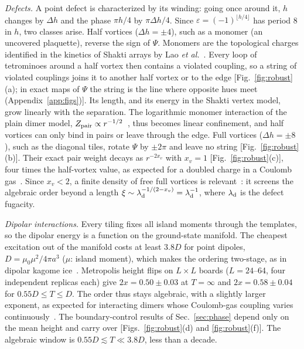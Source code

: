\documentclass[aps,prb,twocolumn,floatfix,longbibliography]{revtex4-2}
\newcommand{\eps}{\varepsilon}
\newcommand{\floor}[1]{\lfloor #1\rfloor}
\begin{document}
\emph{Defects.} A point defect is characterized by its winding: going once around it, $h$ changes by $\Delta h$ and the phase $\pi h/4$ by $\pi\Delta h/4$. Since $\eps=(-1)^{\floor{h/4}}$ has period 8 in $h$, two classes arise. Half vortices ($\Delta h=\pm4$), such as a monomer (an uncovered plaquette), reverse the sign of $\Psi$. Monomers are the topological charges identified in the kinetics of Shakti arrays by Lao \emph{et al.}~\cite{Lao2018}. Every loop of tetrominoes around a half vortex then contains a violated coupling, so a string of violated couplings joins it to another half vortex or to the edge [Fig.~\ref{fig:robust}(a); in exact maps of $\Psi$ the string is the line where opposite hues meet (Appendix~\ref{app:figs})]. Its length, and its energy in the Shakti vertex model, grow linearly with the separation. The logarithmic monomer interaction of the plain dimer model, $Z_{\rm pair}\propto r^{-1/2}$~\cite{Fisher1963}, thus becomes linear confinement, and half vortices can only bind in pairs or leave through the edge. Full vortices ($\Delta h=\pm8$), such as the diagonal tiles, rotate $\Psi$ by $\pm2\pi$ and leave no string [Fig.~\ref{fig:robust}(b)]. Their exact pair weight decays as $r^{-2x_v}$ with $x_v=1$ [Fig.~\ref{fig:robust}(c)], four times the half-vortex value, as expected for a doubled charge in a Coulomb gas~\cite{Nienhuis1987}. Since $x_v<2$, a finite density of free full vortices is relevant~\cite{Kosterlitz1973,Jose1977}: it screens the algebraic order beyond a length $\xi\sim\lambda_{\rm d}^{-1/(2-x_v)}=\lambda_{\rm d}^{-1}$, where $\lambda_{\rm d}$ is the defect fugacity.

\emph{Dipolar interactions.} Every tiling fixes all island moments through the templates, so the dipolar energy is a function on the ground-state manifold. The cheapest excitation out of the manifold costs at least $3.8D$ for point dipoles, $D=\mu_0\mu^2/4\pi a^3$ ($\mu$: island moment), which makes the ordering two-stage, as in dipolar kagome ice~\cite{Chern2011}. Metropolis height flips on $L\times L$ boards ($L=24$--64, four independent replicas each) give $2x=0.50\pm0.03$ at $T=\infty$ and $2x=0.58\pm0.04$ for $0.55D\le T\le D$. The order thus stays algebraic, with a slightly larger exponent, as expected for interacting dimers whose Coulomb-gas coupling varies continuously~\cite{Alet2005}. The boundary-control results of Sec.~\ref{sec:phase} depend only on the mean height and carry over [Figs.~\ref{fig:robust}(d) and \ref{fig:robust}(f)]. The algebraic window is $0.55D\lesssim T\ll3.8D$, less than a decade.
\end{document}
